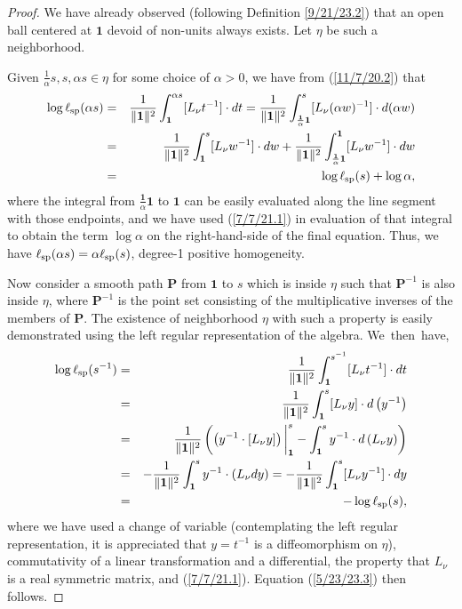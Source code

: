\documentclass{amsart}
\numberwithin{equation}{section}
\theoremstyle{definition}
\numberwithin{theorem}{section}
\begin{document}
\begin{proof} We have already observed (following Definition \ref{9/21/23.2}) that an open ball centered at $\mathbf{1}$ devoid of non-units always exists.  Let $\eta$  be such a neighborhood.

Given $\frac{1}{\alpha}s,s,\alpha s\in\eta$ for some choice of $\alpha>0$, we have from (\ref{11/7/20.2}) that
\begin{eqnarray}\nonumber  \log\ell_{\rm sp}(\alpha s) &=&  \frac{1}{\|{\bf 1}\|^2}\int_{\bf 1}^{\alpha s} [L_{\nu}t^{-1}]\cdot dt = \frac{1}{\|{\bf 1}\|^2}\int_{\frac{\mathbf{1}}{\alpha}\mathbf{1}}^{s} [L_{\nu}(\alpha w)^{-1}]\cdot d(\alpha w)  \\ \nonumber &=&  \frac{1}{\|{\bf 1}\|^2}\int_{\mathbf{1}}^{s} [L_{\nu}w^{-1}]\cdot dw + \frac{1}{\|{\bf 1}\|^2}\int_{\frac{\mathbf{1}}{\alpha} \mathbf{1}}^{\mathbf{1}} [L_{\nu}w^{-1}]\cdot dw  \\ &=& \log \ell_{\rm sp}(s) + \log\alpha, \label{4/2/23.1}
\end{eqnarray} where the integral from $\frac{\mathbf{1}}{\alpha} \mathbf{1}$ to $\mathbf{1}$ can be easily evaluated along the line segment with those endpoints, and we have used (\ref{7/7/21.1}) in evaluation of that integral to obtain the term $\log \alpha$ on the right-hand-side of the final equation.  Thus, we have $\ell_{\rm sp}(\alpha s) = \alpha\ell_{\rm sp}(s)$, degree-1 positive homogeneity.

\enlargethispage{2cm}
Now consider a smooth path $\mathbf{P}$ from $\mathbf{1}$ to $s$ which is inside $\eta$  such that $\mathbf{P}^{-1}$ is also inside $\eta$,  where $\mathbf{P}^{-1}$ is the point set consisting of the multiplicative inverses of the members of $\mathbf{P}$.  The  existence of neighborhood $\eta$ with such a property is  easily demonstrated using the left regular representation of the algebra.
\mbox{We then have,} \begin{eqnarray}  \log \ell_{\rm sp}(s^{-1})   &=&   \frac{1}{\|{\bf 1}\|^2} \int_{\bf 1}^{s^{-1}} [L_{\nu}t^{-1}] \cdot dt \nonumber \\ &=&  \frac{1}{\|{\bf 1}\|^2} \int_{\bf 1}^s [L_{\nu}y]\cdot d\left(y^{-1}\right) \nonumber \\ &=&  \frac{1}{\|{\bf 1}\|^2}\left(\left(y^{-1}\cdot [L_{\nu}y]\right)\bigg|_{\bf 1}^s - \int_{\bf 1}^s y^{-1}\cdot d\left(L_{\nu}y\right)\right)   \nonumber \\ &=& -\frac{1}{\|{\bf 1}\|^2} \int_{\bf 1}^s y^{-1}\cdot (L_{\nu}dy) = -\frac{1}{\|{\bf 1}\|^2} \int_{\bf 1}^s [L_{\nu}y^{-1}] \cdot dy  \nonumber \\ &=& -\log \ell_{\rm sp}(s),\label{4/2/23.5} \end{eqnarray} where we have used a change of variable (contemplating the left regular representation, it is appreciated that $y=t^{-1}$ is a diffeomorphism on $\eta$), commutativity of a linear transformation and a differential, the property that $L_{\nu}$ is a real symmetric matrix, and  (\ref{7/7/21.1}).  Equation (\ref{5/23/23.3}) then follows.
\end{proof}
\end{document}
